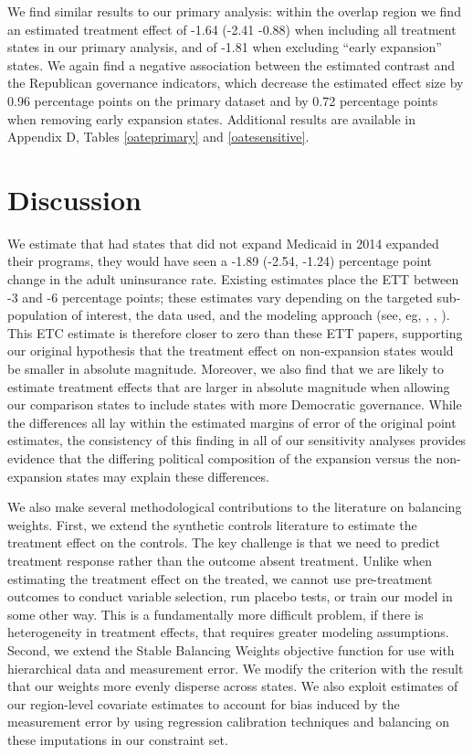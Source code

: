 \documentclass[12pt]{article}
\begin{document}
We find similar results to our primary analysis: within the overlap region we find an estimated treatment effect of -1.64 (-2.41 -0.88) when including all treatment states in our primary analysis, and of -1.81 when excluding ``early expansion'' states. We again find a negative association between the estimated contrast and the Republican governance indicators, which decrease the estimated effect size by 0.96 percentage points on the primary dataset and by 0.72 percentage points when removing early expansion states. Additional results are available in Appendix D, Tables \ref{oateprimary} and \ref{oatesensitive}.

\section{Discussion}

We estimate that had states that did not expand Medicaid in 2014 expanded their programs, they would have seen a -1.89 (-2.54, -1.24) percentage point change in the adult uninsurance rate. Existing estimates place the ETT between -3 and -6 percentage points; these estimates vary depending on the targeted sub-population of interest, the data used, and the modeling approach (see, eg, \cite{courtemanche2017early}, \cite{kaestner2017effects}, \cite{frean2017premium}). This ETC estimate is therefore closer to zero than these ETT papers, supporting our original hypothesis that the treatment effect on non-expansion states would be smaller in absolute magnitude. Moreover, we also find that we are likely to estimate treatment effects that are larger in absolute magnitude when allowing our comparison states to include states with more Democratic governance. While the differences all lay within the estimated margins of error of the original point estimates, the consistency of this finding in all of our sensitivity analyses provides evidence that the differing political composition of the expansion versus the non-expansion states may explain these differences. 

We also make several methodological contributions to the literature on balancing weights. First, we extend the synthetic controls literature to estimate the treatment effect on the controls. The key challenge is that we need to predict treatment response rather than the outcome absent treatment. Unlike when estimating the treatment effect on the treated, we cannot use pre-treatment outcomes to conduct variable selection, run placebo tests, or train our model in some other way. This is a fundamentally more difficult problem, if there is heterogeneity in treatment effects, that requires greater modeling assumptions. Second, we extend the Stable Balancing Weights objective function for use with hierarchical data and measurement error. We modify the criterion with the result that our weights more evenly disperse across states. We also exploit estimates of our region-level covariate estimates to account for bias induced by the measurement error by using regression calibration techniques and balancing on these imputations in our constraint set.
\end{document}
